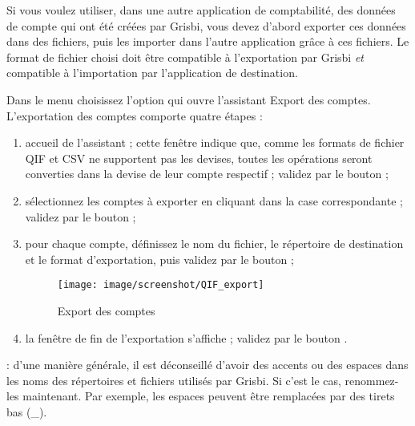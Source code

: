 Si vous voulez utiliser, dans une autre application de comptabilité, des données de compte qui ont été créées par Grisbi, vous devez d'abord exporter ces données dans des fichiers, puis les importer dans l'autre application grâce à ces fichiers. Le format de fichier choisi doit être compatible à l'exportation par Grisbi \emph{et} compatible à l'importation par l'application de destination.
 
Dans le menu  choisissez l'option  qui ouvre l'assistant Export des comptes. L'exportation des comptes comporte quatre étapes :

\begin{enumerate}
	\item accueil de l'assistant ; cette fenêtre indique que, comme les formats de fichier QIF et CSV ne supportent pas les devises, toutes les opérations seront converties dans la devise de leur compte respectif ; validez par le bouton  ;
	\item sélectionnez les comptes à exporter en cliquant dans la case correspondante ; validez par le bouton  ;
	\item pour chaque compte, définissez le nom du fichier, le répertoire de destination et le format d'exportation, puis validez par le bouton   ;
	\begin{figure}[t]
	\begin{center}
	\texttt{[image: image/screenshot/QIF\_export]}
	\end{center}
	\caption{Export des comptes}
	\label{QIF-export-img}
	\end{figure}
	
	\item la fenêtre de fin de l'exportation s'affiche ; validez par le bouton .
\end{enumerate}

 : d'une manière générale, il est déconseillé d'avoir des accents ou des espaces dans les noms des répertoires et fichiers utilisés par Grisbi. Si c'est le cas, renommez-les maintenant. Par exemple, les espaces peuvent être remplacées par des tirets bas (\_).











